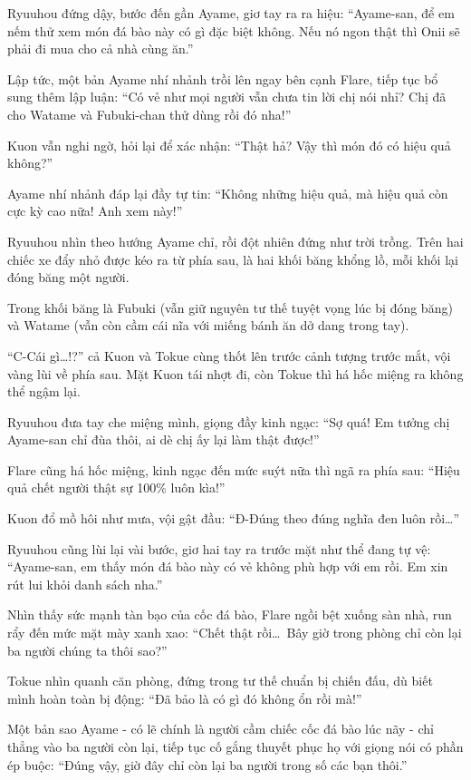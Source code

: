 \documentclass[../main.tex]{subfiles}
\begin{document}
Ryuuhou đứng dậy, bước đến gần Ayame, giơ tay ra ra hiệu: ``Ayame-san, để em nếm thử xem món đá bào này có gì đặc biệt không. Nếu nó ngon thật thì Onii sẽ phải đi mua cho cả nhà cùng ăn.''

Lập tức, một bản Ayame nhí nhảnh trồi lên ngay bên cạnh Flare, tiếp tục bổ sung thêm lập luận: ``Có vẻ như mọi người vẫn chưa tin lời chị nói nhỉ? Chị đã cho Watame và Fubuki-chan thử dùng rồi đó nha!''

Kuon vẫn nghi ngờ, hỏi lại để xác nhận: ``Thật hả? Vậy thì món đó có hiệu quả không?''

Ayame nhí nhảnh đáp lại đầy tự tin: ``Không những hiệu quả, mà hiệu quả còn cực kỳ cao nữa! Anh xem này!''

Ryuuhou nhìn theo hướng Ayame chỉ, rồi đột nhiên đứng như trời trồng. Trên hai chiếc xe đẩy nhỏ được kéo ra từ phía sau, là hai khối băng khổng lồ, mỗi khối lại đóng băng một người.

Trong khối băng là Fubuki (vẫn giữ nguyên tư thế tuyệt vọng lúc bị đóng băng) và Watame (vẫn còn cầm cái nĩa với miếng bánh ăn dở dang trong tay).


``C-Cái gì\dots!?'' cả Kuon và Tokue cùng thốt lên trước cảnh tượng trước mắt, vội vàng lùi về phía sau. Mặt Kuon tái nhợt đi, còn Tokue thì há hốc miệng ra không thể ngậm lại.

Ryuuhou đưa tay che miệng mình, giọng đầy kinh ngạc: ``Sợ quá! Em tưởng chị Ayame-san chỉ đùa thôi, ai dè chị ấy lại làm thật được!''

Flare cũng há hốc miệng, kinh ngạc đến mức suýt nữa thì ngã ra phía sau: ``Hiệu quả chết người thật sự 100\% luôn kìa!''

Kuon đổ mồ hôi như mưa, vội gật đầu: ``Đ-Đúng theo đúng nghĩa đen luôn rồi\dots''

Ryuuhou cũng lùi lại vài bước, giơ hai tay ra trước mặt như thể đang tự vệ: ``Ayame-san, em thấy món đá bào này có vẻ không phù hợp với em rồi. Em xin rút lui khỏi danh sách nha.''

Nhìn thấy sức mạnh tàn bạo của cốc đá bào, Flare ngồi bệt xuống sàn nhà, run rẩy đến mức mặt mày xanh xao: ``Chết thật rồi\dots\ Bây giờ trong phòng chỉ còn lại ba người chúng ta thôi sao?''

Tokue nhìn quanh căn phòng, đứng trong tư thế chuẩn bị chiến đấu, dù biết mình hoàn toàn bị động: ``Đã bảo là có gì đó không ổn rồi mà!''

Một bản sao Ayame - có lẽ chính là người cầm chiếc cốc đá bào lúc nãy - chỉ thẳng vào ba người còn lại, tiếp tục cố gắng thuyết phục họ với giọng nói có phần ép buộc: ``Đúng vậy, giờ đây chỉ còn lại ba người trong số các bạn thôi.''
\end{document}
